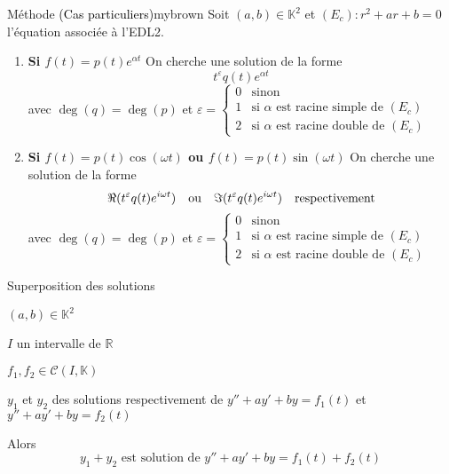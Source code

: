     \begin{omed}{Méthode \textcolor{black}{(Cas particuliers)}}{mybrown}
        Soit $(a,b) \in \mathbb{K}^{2}$ et $(E_c) : r^{2} + ar+ b = 0$ l’équation associée à l’EDL2.
        \begin{enumerate}
            \item \textbf{Si $f(t) = p(t)e^{\alpha t}$} \quad On cherche une solution de la forme \[ t^{\varepsilon} q(t)e^{\alpha t} \] avec $\deg(q) = \deg(p)$ et $\varepsilon = \left\{ \begin{array}{cl}
                0 & \text{sinon} \\
                1 & \text{si } \alpha \text{ est racine simple de } (E_c) \\
                2 & \text{si } \alpha \text{ est racine double de } (E_c)
            \end{array}\right.$
            \item \textbf{Si $f(t) = p(t)\cos(\omega t)$ ou $f(t)=p(t)\sin(\omega t)$} \quad On cherche une solution de la forme 
            \[ \Re(t^{\varepsilon}q(t)e^{i \omega t}) \quad \text{ou} \quad \Im(t^{\varepsilon}q(t)e^{i \omega t}) \quad \text{respectivement}\] 
            avec $\deg(q) = \deg(p)$ et $\varepsilon = \left\{ \begin{array}{cl}
                0 & \text{sinon} \\
                1 & \text{si } \alpha \text{ est racine simple de } (E_c) \\
                2 & \text{si } \alpha \text{ est racine double de } (E_c)
            \end{array}\right.$
        \end{enumerate}
    \end{omed}

    \begin{theo}{Superposition des solutions}{}
        \begin{soient}
            \item $(a,b) \in \mathbb{K}^2$
            \item $I$ un intervalle de $\mathbb{R}$
            \item $f_1, f_2 \in \mathcal{C}(I,\mathbb{K})$
            \item $y_1$ et $y_2$ des solutions respectivement de $y'' + ay' + by = f_1(t)$ et $y'' + ay' + by = f_2(t)$
        \end{soient}
        Alors \[ y_1 + y_2 \text{ est solution de } y'' + ay' + by = f_1(t) + f_2(t) \]
    \end{theo}

